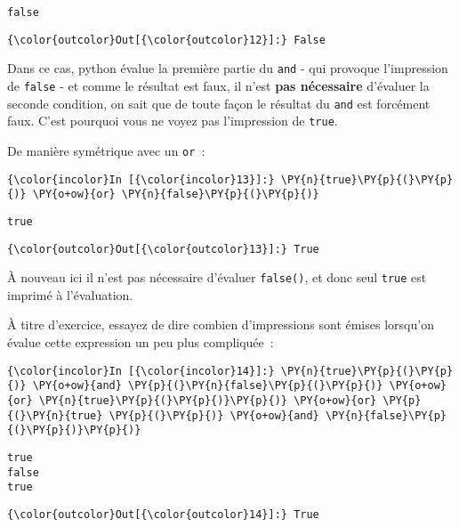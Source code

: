     \begin{Verbatim}[commandchars=\\\{\}]
false

    \end{Verbatim}

\begin{Verbatim}[commandchars=\\\{\}]
{\color{outcolor}Out[{\color{outcolor}12}]:} False
\end{Verbatim}
            
    Dans ce cas, python évalue la première partie du \texttt{and} - qui
provoque l'impression de \texttt{false} - et comme le résultat est faux,
il n'est \textbf{pas nécessaire} d'évaluer la seconde condition, on sait
que de toute façon le résultat du \texttt{and} est forcément faux. C'est
pourquoi vous ne voyez pas l'impression de \texttt{true}.

    De manière symétrique avec un \texttt{or}~:

    \begin{Verbatim}[commandchars=\\\{\}]
{\color{incolor}In [{\color{incolor}13}]:} \PY{n}{true}\PY{p}{(}\PY{p}{)} \PY{o+ow}{or} \PY{n}{false}\PY{p}{(}\PY{p}{)}
\end{Verbatim}


    \begin{Verbatim}[commandchars=\\\{\}]
true

    \end{Verbatim}

\begin{Verbatim}[commandchars=\\\{\}]
{\color{outcolor}Out[{\color{outcolor}13}]:} True
\end{Verbatim}
            
    À nouveau ici il n'est pas nécessaire d'évaluer \texttt{false()}, et
donc seul \texttt{true} est imprimé à l'évaluation.

    À titre d'exercice, essayez de dire combien d'impressions sont émises
lorsqu'on évalue cette expression un peu plus compliquée~:

    \begin{Verbatim}[commandchars=\\\{\}]
{\color{incolor}In [{\color{incolor}14}]:} \PY{n}{true}\PY{p}{(}\PY{p}{)} \PY{o+ow}{and} \PY{p}{(}\PY{n}{false}\PY{p}{(}\PY{p}{)} \PY{o+ow}{or} \PY{n}{true}\PY{p}{(}\PY{p}{)}\PY{p}{)} \PY{o+ow}{or} \PY{p}{(}\PY{n}{true} \PY{p}{(}\PY{p}{)} \PY{o+ow}{and} \PY{n}{false}\PY{p}{(}\PY{p}{)}\PY{p}{)}
\end{Verbatim}


    \begin{Verbatim}[commandchars=\\\{\}]
true
false
true

    \end{Verbatim}

\begin{Verbatim}[commandchars=\\\{\}]
{\color{outcolor}Out[{\color{outcolor}14}]:} True
\end{Verbatim}
            

    
    
    

